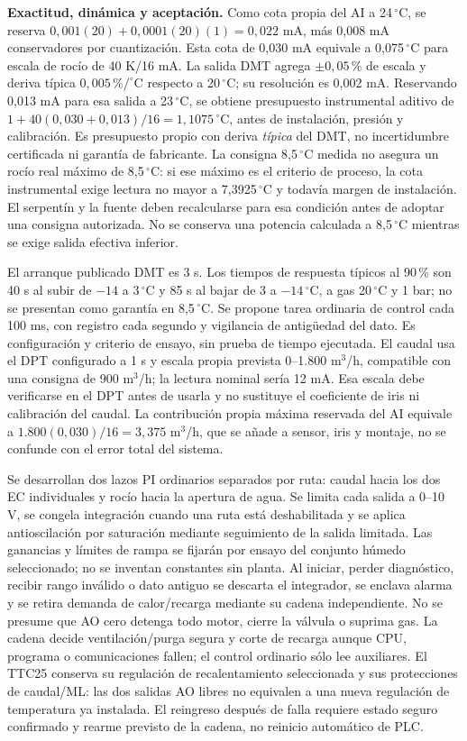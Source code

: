 \textbf{Exactitud, dinámica y aceptación.} Como cota propia del AI a 24\,$^{\circ}$C, se reserva $0,001(20)+0,0001(20)(1)=0,022$ mA, más 0,008 mA conservadores por cuantización. Esta cota de 0,030 mA equivale a 0,075\,$^{\circ}$C para escala de rocío de 40 K/16 mA. La salida DMT agrega $\pm0,05\,\%$ de escala y deriva típica $0,005\,\%/^{\circ}$C respecto a 20\,$^{\circ}$C; su resolución es 0,002 mA. Reservando 0,013 mA para esa salida a 23\,$^{\circ}$C, se obtiene presupuesto instrumental aditivo de $1+40(0,030+0,013)/16=1,1075\,^{\circ}$C, antes de instalación, presión y calibración. Es presupuesto propio con deriva \emph{típica} del DMT, no incertidumbre certificada ni garantía de fabricante. La consigna 8,5\,$^{\circ}$C medida no asegura un rocío real m\'aximo de 8,5\,$^{\circ}$C: si ese m\'aximo es el criterio de proceso, la cota instrumental exige lectura no mayor a 7,3925\,$^{\circ}$C y todavía margen de instalación. El serpentín y la fuente deben recalcularse para esa condición antes de adoptar una consigna autorizada. No se conserva una potencia calculada a 8,5\,$^{\circ}$C mientras se exige salida efectiva inferior.

El arranque publicado DMT es 3 s. Los tiempos de respuesta típicos al 90\,\% son 40 s al subir de $-14$ a $3\,^{\circ}$C y 85 s al bajar de $3$ a $-14\,^{\circ}$C, a gas 20\,$^{\circ}$C y 1 bar; no se presentan como garantía en 8,5\,$^{\circ}$C. Se propone tarea ordinaria de control cada 100 ms, con registro cada segundo y vigilancia de antigüedad del dato. Es configuración y criterio de ensayo, sin prueba de tiempo ejecutada. El caudal usa el DPT configurado a 1 s y escala propia prevista 0--1.800 m$^3$/h, compatible con una consigna de 900 m$^3$/h; la lectura nominal sería 12 mA. Esa escala debe verificarse en el DPT antes de usarla y no sustituye el coeficiente de iris ni calibración del caudal. La contribución propia máxima reservada del AI equivale a $1.800(0,030)/16=3,375$ m$^3$/h, que se añade a sensor, iris y montaje, no se confunde con el error total del sistema.

Se desarrollan dos lazos PI ordinarios separados por ruta: caudal hacia los dos EC individuales y rocío hacia la apertura de agua. Se limita cada salida a 0--10 V, se congela integración cuando una ruta está deshabilitada y se aplica antioscilación por saturación mediante seguimiento de la salida limitada. Las ganancias y límites de rampa se fijarán por ensayo del conjunto húmedo seleccionado; no se inventan constantes sin planta. Al iniciar, perder diagnóstico, recibir rango inválido o dato antiguo se descarta el integrador, se enclava alarma y se retira demanda de calor/recarga mediante su cadena independiente. No se presume que AO cero detenga todo motor, cierre la válvula o suprima gas. La cadena decide ventilación/purga segura y corte de recarga aunque CPU, programa o comunicaciones fallen; el control ordinario sólo lee auxiliares. El TTC25 conserva su regulación de recalentamiento seleccionada y sus protecciones de caudal/ML: las dos salidas AO libres no equivalen a una nueva regulación de temperatura ya instalada. El reingreso después de falla requiere estado seguro confirmado y rearme previsto de la cadena, no reinicio automático de PLC.

